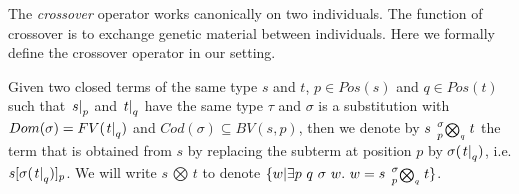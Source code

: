

The {\it crossover} operator works canonically on two individuals. The function of crossover is to exchange genetic material between individuals. Here we formally define the crossover operator in our setting.

\begin{defn}
  Given two closed terms of the same type $s$ and $t$, $p \in Pos(s)$ and $q \in Pos(t)$ such that $\left. s \right|_{p}$ and $\left. t \right|_{q}$ have the same type $\tau$ and $\sigma$ is a substitution with  $Dom(\sigma) = FV(\left. t \right|_{q})$ and $Cod(\sigma) \subseteq BV(s, p)$, then we denote by $s \left.\sideset{_{p}^{\sigma}}{_{q}^{}}{\scriptstyle\bigotimes}\right. t$ the term that is obtained from $s$ by replacing the subterm at position $p$ by $\sigma(\left. t \right|_{q})$, i.e. $s [\sigma(\left. t \right|_{q})]_{p}$. We will write $s\,{\scriptstyle\bigotimes}\, t$ to denote $\{w | \exists p\ q\ \sigma\ w.\ w = s \left.\sideset{_{p}^{\sigma}}{_{q}^{}}{\scriptstyle\bigotimes}\right. t\}$.
\end{defn}

